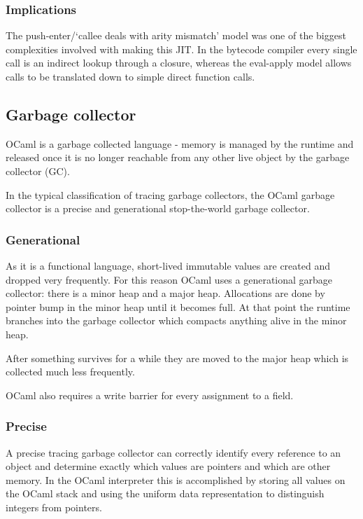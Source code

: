 \subsubsection{Implications}

The push-enter/`callee deals with arity mismatch' model was one of the biggest complexities
involved with
making this JIT. In the bytecode compiler every single call is an indirect lookup through a
closure, whereas the eval-apply model allows calls to be translated down to simple direct function
calls.

\subsection{Garbage collector}

OCaml is a garbage collected language - memory is managed by the runtime and released once it is
no longer reachable from any other live object by the garbage collector (GC).

In the typical classification of tracing garbage collectors, the OCaml garbage collector is a
precise and generational stop-the-world garbage collector.

\subsubsection{Generational}

As it is a functional language, short-lived immutable values are created and dropped very
frequently. For this reason OCaml uses a generational garbage collector: there is a minor heap and
a major heap. Allocations are done by pointer bump in the minor heap
until it becomes full. At that point the runtime branches into the garbage collector which compacts
anything alive in the minor heap.

After something survives for a while they are moved to the major heap which is collected much less
frequently.

OCaml also requires a write barrier for every assignment to a field.

\subsubsection{Precise}

A precise tracing garbage collector can correctly identify every reference to an object and
determine exactly which values are pointers and which are other memory. In the OCaml interpreter
this is accomplished by storing all values on the OCaml stack and using the uniform data
representation to distinguish integers from pointers.

